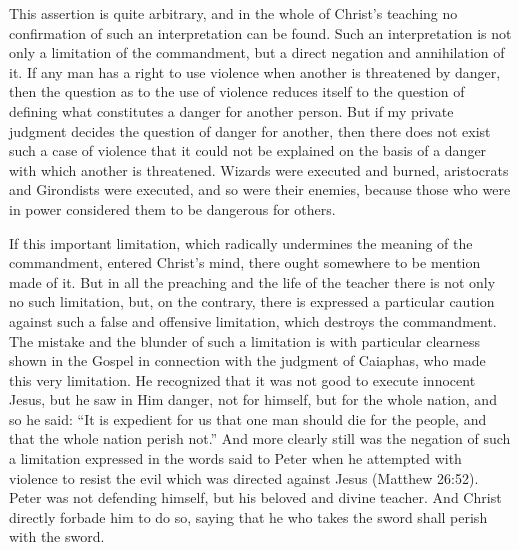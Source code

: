 \documentclass{book}
\begin{document}
This assertion is quite arbitrary, and in the whole of Christ’s teaching no confirmation of such an interpretation can be found. Such an interpretation is not only a limitation of the commandment, but a direct negation and annihilation of it. If any man has a right to use violence when another is threatened by danger, then the question as to the use of violence reduces itself to the question of defining what constitutes a danger for another person. But if my private judgment decides the question of danger for another, then there does not exist such a case of violence that it could not be explained on the basis of a danger with which another is threatened. Wizards were executed and burned, aristocrats and Girondists were executed, and so were their enemies, because those who were in power considered them to be dangerous for others.

If this important limitation, which radically undermines the meaning of the commandment, entered Christ’s mind, there ought somewhere to be mention made of it. But in all the preaching and the life of the teacher there is not only no such limitation, but, on the contrary, there is expressed a particular caution against such a false and offensive limitation, which destroys the commandment. The mistake and the blunder of such a limitation is with particular clearness shown in the Gospel in connection with the judgment of Caiaphas, who made this very limitation. He recognized that it was not good to execute innocent Jesus, but he saw in Him danger, not for himself, but for the whole nation, and so he said: “It is expedient for us that one man should die for the people, and that the whole nation perish not.” And more clearly still was the negation of such a limitation expressed in the words said to Peter when he attempted with violence to resist the evil which was directed against Jesus (Matthew 26:52). Peter was not defending himself, but his beloved and divine teacher. And Christ directly forbade him to do so, saying that he who takes the sword shall perish with the sword.
\end{document}
